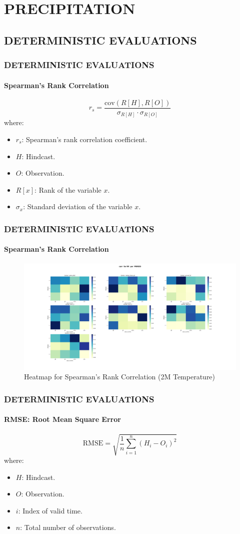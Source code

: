 
\section{PRECIPITATION}
\subsection{DETERMINISTIC EVALUATIONS}

\begin{frame}
\frametitle{DETERMINISTIC EVALUATIONS}
\framesubtitle{Spearman's Rank Correlation}
$$r_s = \frac{\text{cov}(R[H], R[O])}{\sigma_{R[H]} \cdot \sigma_{R[O]}}$$
where:
\begin{itemize}
    \item \( r_s \): Spearman's rank correlation coefficient.
    \item \( H \): Hindcast.
    \item \( O \): Observation.
    \item \( R[x] \): Rank of the variable \( x \).
    \item \( \sigma_x \): Standard deviation of the variable \( x \).
\end{itemize}
\end{frame}

\begin{frame}
\frametitle{DETERMINISTIC EVALUATIONS}
\framesubtitle{Spearman's Rank Correlation}
\begin{figure}[H]
    \centering
    \includegraphics[width=1\linewidth]{corr_RR_ PERIOD.png}
    \caption{Heatmap for Spearman's Rank Correlation (2M Temperature)}
    \label{fig:spearman-correlation}
\end{figure}
\end{frame}

\begin{frame}
\frametitle{DETERMINISTIC EVALUATIONS}
\framesubtitle{RMSE: Root Mean Square Error}

$$\text{RMSE} = \sqrt{\frac{1}{n} \sum\limits_{i=1}^{n}(H_i - O_i)^2}$$
where:
\begin{itemize}
    \item \( H \): Hindcast.
    \item \( O \): Observation.
    \item \( i \): Index of valid time.
    \item \( n \): Total number of observations.
\end{itemize}
\end{frame}

